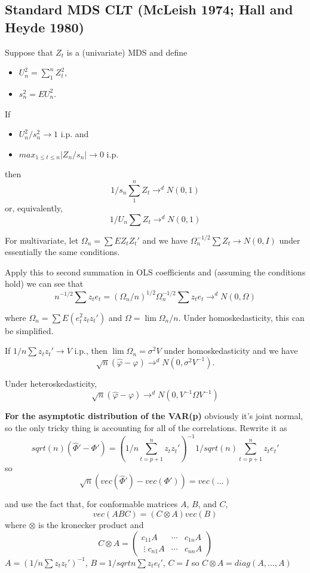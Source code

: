 \subsection{Standard MDS CLT (McLeish 1974; Hall and Heyde 1980)}

Suppose that $Z_t$ is a (univariate) MDS and define
\begin{itemize}
\item $U_n^2 = ∑_1^n Z_t^2$,
\item $s_n^2 = E U_n^2$.
\end{itemize}
If
\begin{itemize}
\item $U_n^2 / s_n^2 → 1$ i.p. and
\item $max_{1 ≤ t ≤ n} |Z_n / s_n| → 0$ i.p.
\end{itemize}
then
\[1/s_n ∑_1^n Z_t →^d N(0, 1)\]
or, equivalently,
\[1/U_n ∑ Z_t →^d N(0, 1)\]

For multivariate, let $Ω_n = ∑ E Z_t Z_t'$ and we have $Ω_n^{-1/2} ∑
Z_t → N(0, I)$ under essentially the same conditions.

Apply this to second summation in OLS coefficients and (assuming the
conditions hold) we can see that
\[n^{-1/2} ∑ z_t e_t = ( Ω_n / n )^{1/2} Ω_n^{-1/2} ∑ z_t e_t
→^d N(0,Ω) \]

where $Ω_n = ∑ E( e_t^2 z_t z_t' )$ and $Ω = \lim Ω_n / n$. Under
homoskedasticity, this can be simplified.

If $1/n ∑ z_t z_t' → V$ i.p., then $\lim Ω_n = σ^2 V$ under
homoskedasticity and we have
\[\sqrt{n} ( \hat φ - φ ) →^d N( 0, σ^2 V^{-1} ).\]

Under heteroskedasticity,
\[\sqrt{n} (\hat φ - φ ) →^d N( 0, V^{-1} Ω V^{-1} )\]

\textbf{For the asymptotic distribution of the VAR(p)} obviously it's
joint normal, so the only tricky thing is accounting for all of the
correlations. Rewrite it as
\[
sqrt(n) (\hat Φ' - Φ')
= (1/n ∑_{t=p+1}^n z_t z_t')^{-1} 1/sqrt(n) ∑_{t=p+1}^n z_t e_t'
\]
so
\[\sqrt{n} ( vec(\hat Φ' ) - vec( Φ' ) ) = vec( … )\]

and use the fact that, for conformable matrices $A$, $B$, and $C$,
\[vec( A B C ) = ( C ⊗ A ) vec( B )\]
where $⊗$ is the kronecker product and
\[
C ⊗ A = 
\begin{pmatrix}
  c_{11}A & ⋯ & c_{1n}A \\
  ⋮
  c_{n1}A & ⋯ & c_{nn}A 
\end{pmatrix}
\]
$A = ( 1/n ∑ z_t z_t' )^{-1}$, $B = 1/sqrt{n} ∑ z_t e_t'$, $C = I$ so
$C ⊗ A = diag( A,…, A )$

